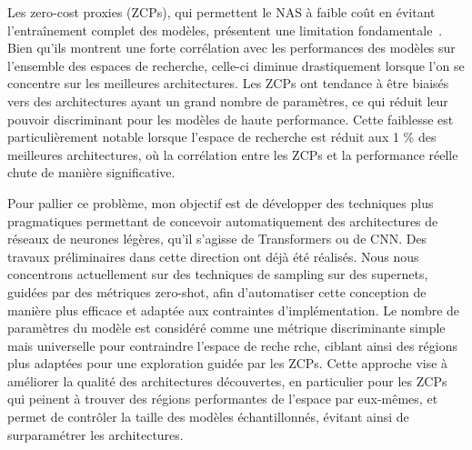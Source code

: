 \documentclass[11pt]{report}
\begin{document}
Les zero-cost proxies (ZCPs), qui permettent le NAS à faible coût en évitant l'entraînement complet des modèles, présentent une limitation fondamentale~\cite{lymanson:hal-04576139}. Bien qu'ils montrent une forte corrélation avec les performances des modèles sur l'ensemble des espaces de recherche, celle-ci diminue drastiquement lorsque l'on se concentre sur les meilleures architectures. Les ZCPs ont tendance à être biaisés vers des architectures ayant un grand nombre de paramètres, ce qui réduit leur pouvoir discriminant pour les modèles de haute performance. Cette faiblesse est particulièrement notable lorsque l'espace de recherche est réduit aux 1 \% des meilleures architectures, où la corrélation entre les ZCPs et la performance réelle chute de manière significative.

Pour pallier ce problème, mon objectif est de développer des techniques plus pragmatiques permettant de concevoir automatiquement des architectures de réseaux de neurones légères, qu'il s'agisse de Transformers ou de CNN. Des travaux préliminaires dans cette direction ont déjà été réalisés. Nous nous concentrons actuellement sur des techniques de sampling sur des supernets, guidées par des métriques zero-shot, afin d'automatiser cette conception de manière plus efficace et adaptée aux contraintes d'implémentation. Le nombre de paramètres du modèle est considéré comme une métrique discriminante simple mais universelle pour contraindre l'espace de reche rche, ciblant ainsi des régions plus adaptées pour une exploration guidée par les ZCPs. Cette approche vise à améliorer la qualité des architectures découvertes, en particulier pour les ZCPs qui peinent à trouver des régions performantes de l'espace par eux-mêmes, et permet de contrôler la taille des modèles échantillonnés, évitant ainsi de surparamétrer les architectures.
\end{document}

